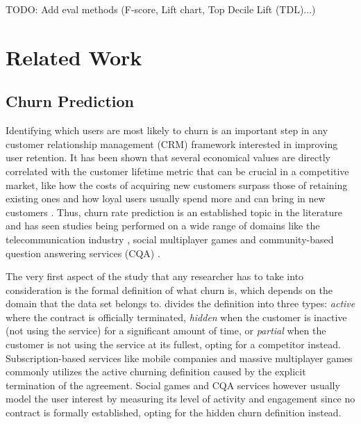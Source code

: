 \documentclass{kththesis}
\begin{document}
TODO: Add eval methods (F-score, Lift chart, Top Decile Lift (TDL)...)

\chapter{Related Work}

\section{Churn Prediction}

Identifying which users are most likely to churn is an important step in any customer relationship management (CRM) framework interested in improving user retention. It has been shown that several economical values are directly correlated with the customer lifetime metric that can be crucial in a competitive market, like how the costs of acquiring new customers surpass those of retaining existing ones and how loyal users usually spend more and can bring in new customers \citep{GurAli2014}. Thus, churn rate prediction is an established topic in the literature and has seen studies being performed on a wide range of domains like the telecommunication industry \citep{Lu2014}\citep{Khan2015}\citep{Hassouna2015}, social multiplayer games \citep{Borbora2011}\citep{Runge2014} and community-based question answering services (CQA) \citep{Pudipeddi2014}\citep{Dror2012}. 

The very first aspect of the study that any researcher has to take into consideration is the formal definition of what churn is, which depends on the domain that the data set belongs to. \citep{lazarov2007churn} divides the definition into three types: \emph{active} where the contract is officially terminated, \emph{hidden} when the customer is inactive (not using the service) for a significant amount of time, or \emph{partial} when the customer is not using the service at its fullest, opting for a competitor instead. Subscription-based services like mobile companies \citep{Lu2014}\citep{Hassouna2015} and massive multiplayer games \citep{Borbora2011} commonly utilizes the active churning definition caused by the explicit termination of the agreement. Social games \citep{Runge2014}\citep{Drachen2016RapidPO} and CQA services \citep{Pudipeddi2014}\citep{Dror2012} however usually model the user interest by measuring its level of activity and engagement since no contract is formally established, opting for the hidden churn definition instead. 
\end{document}
